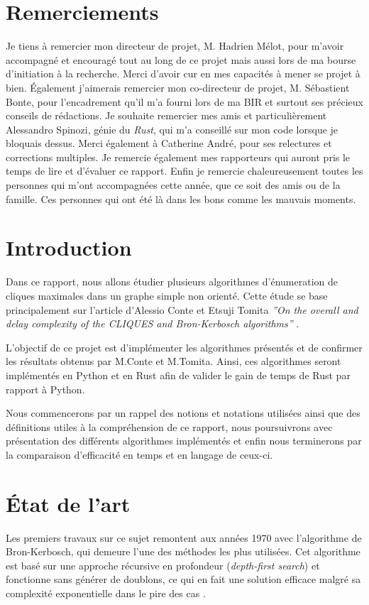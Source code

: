 \documentclass[12pt,a4paper]{article}
\begin{document}
\section*{Remerciements}

Je tiens à remercier mon directeur de projet, M. Hadrien Mélot, pour m'avoir accompagné et encouragé tout au long de ce projet mais aussi lors de ma bourse d'initiation à la recherche. Merci d'avoir cur en mes capacités à mener se projet à bien. Également j'aimerais remercier mon co-directeur de projet, M. Sébastient Bonte, pour l'encadrement qu'il m'a fourni lors de ma BIR et surtout ses précieux conseils de rédactions. Je souhaite remercier mes amis et particulièrement Alessandro Spinozi, génie du \emph{Rust}, qui m'a conseillé sur mon code lorsque je bloquais dessus. Merci également à Catherine André, pour ses relectures et corrections multiples. Je remercie également mes rapporteurs qui auront pris le temps de lire et d'évaluer ce rapport.
Enfin je remercie chaleureusement toutes les personnes qui m'ont accompagnées cette année, que ce soit des amis ou de la famille. Ces personnes qui ont été là dans les bons comme les mauvais moments.


\newpage
\tableofcontents

\newpage

\section{Introduction}


Dans ce rapport, nous allons étudier plusieurs algorithmes d'énumeration de cliques maximales dans un graphe simple non orienté. Cette étude se base principalement sur l'article d'Alessio Conte et Etsuji Tomita  \textit{''On the overall and delay complexity of the CLIQUES and Bron-Kerbosch algorithms''} \cite{CONTE20221}.

L'objectif de ce projet est d'implémenter les algorithmes présentés et de confirmer les résultats obtenus par M.Conte et M.Tomita. Ainsi, ces algorithmes seront implémentés en Python et en Rust afin de valider le gain de temps de Rust par rapport à Python.

Nous commencerons par un rappel des notions et notations utilisées ainsi que des définitions utiles à la compréhension de ce rapport, nous poursuivrons avec présentation des différents algorithmes implémentés et enfin nous terminerons par la comparaison d'efficacité en temps et en langage de ceux-ci.


\section{État de l'art}%
\label{sec:etat}
Les premiers travaux sur ce sujet remontent aux années 1970 avec l'algorithme de Bron-Kerbosch\cite{bron1973algorithm}, qui demeure l'une des méthodes les plus utilisées. Cet algorithme est basé sur une approche récursive en profondeur (\textit{depth-first search}) et fonctionne sans générer de doublons, ce qui en fait une solution efficace malgré sa complexité exponentielle dans le pire des cas .
\end{document}
